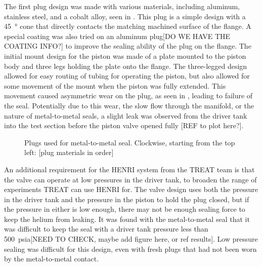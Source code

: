 The first plug design was made with various materials, including aluminum, stainless steel, and a cobalt alloy, seen in . This plug is a simple design with a \SI{45}{\degree} cone that directly contacts the matching machined surface of the flange. A special coating was also tried on an aluminum plug[DO WE HAVE THE COATING INFO?] to improve the sealing ability of the plug on the flange. The initial mount design for the piston was made of a plate mounted to the piston body and three legs holding the plate onto the flange. The three-legged design allowed for easy routing of tubing for operating the piston, but also allowed for some movement of the mount when the piston was fully extended. This movement caused asymmetric wear on the plug, as seen in , leading to failure of the seal. Potentially due to this wear, the slow flow through the manifold, or the nature of metal-to-metal seals, a slight leak was observed from the driver tank into the test section before the piston valve opened fully [REF to plot here?].
\begin{figure}[htbp]
    \vspace{16pt}
    \centering
    \caption{Plugs used for metal-to-metal seal. Clockwise, starting from the top left: [plug materials in order]}
    \label{fig:metal plugs}
    \vspace{16pt}
\end{figure}

An additional requirement for the HENRI system from the TREAT team is that the valve can operate at low pressures in the driver tank, to broaden the range of experiments TREAT can use HENRI for. The valve design uses both the pressure in the driver tank and the pressure in the piston to hold the plug closed, but if the pressure in either is low enough, there may not be enough sealing force to keep the helium from leaking. It was found with the metal-to-metal seal that it was difficult to keep the seal with a driver tank pressure less than \SI{500}{psia}[NEED TO CHECK, maybe add figure here, or ref results]. Low pressure sealing was difficult for this design, even with fresh plugs that had not been worn by the metal-to-metal contact.

